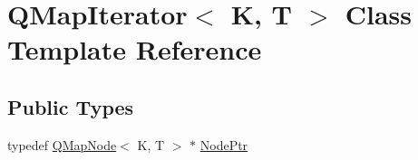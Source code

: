 \hypertarget{class_q_map_iterator}{}\section{Q\+Map\+Iterator$<$ K, T $>$ Class Template Reference}
\label{class_q_map_iterator}
\subsection*{Public Types}
\begin{DoxyCompactItemize}
\item 
typedef \mbox{\hyperlink{struct_q_map_node}{Q\+Map\+Node}}$<$ K, T $>$ $\ast$ \mbox{\hyperlink{class_q_map_iterator_a5c98753ea9eaa24ef743577602acb90b}{Node\+Ptr}}
\end{DoxyCompactItemize}
